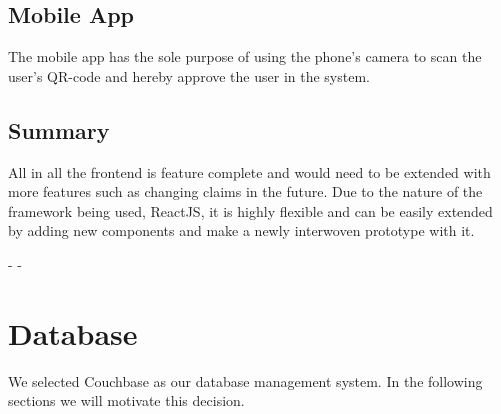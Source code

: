 \subsection{Mobile App}

The mobile app has the sole purpose of using the phone's camera to scan the user's QR-code and hereby approve the user in
the system.

\subsection{Summary}
\label{sec:frontendSummary}

All in all the frontend is feature complete and would need to be extended with more features such as changing claims in
the future. Due to the nature of the framework being used, ReactJS, it is highly flexible and can be easily extended by
adding new components and make a newly interwoven prototype with it.


-%
-%
%

\section{Database}
\label{sec:database}

We selected Couchbase as our database management system. In the following sections we will motivate this decision.

